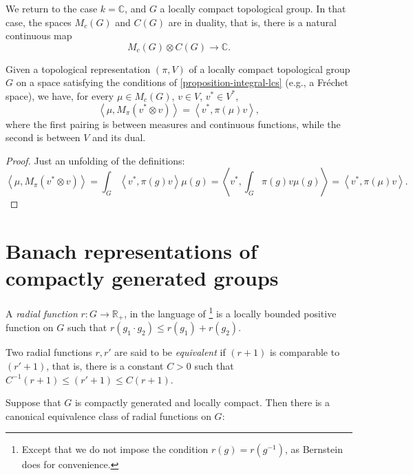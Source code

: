 We return to the case $k=\mathbb C$, and $G$ a locally compact topological group. In that case, the spaces $M_c(G)$ and $C(G)$ are in duality, that is, there is a natural continuous map
$$ M_c(G) \otimes C(G) \to \mathbb C.$$

\begin{lemma}
 \label{lemma-mc-dualto-operator}
Given a topological representation $(\pi, V)$ of  a locally compact topological group $G$ on a space satisfying the conditions of \ref{proposition-integral-lcs} (e.g., a Fr\'echet space), we have, for every $\mu\in M_c(G)$, $v\in V$, $v^*\in V^*$,
\begin{equation}
 \label{equation-mc-dualto-operator}
\left < \mu , M_\pi (v^*\otimes v)\right> = \left < v^*, \pi(\mu) v \right>,
\end{equation}
where the first pairing is between measures and continuous functions, while the second is between $V$ and its dual.
\end{lemma}

\begin{proof}
 Just an unfolding of the definitions:
$$\left < \mu , M_\pi (v^*\otimes v)\right> =  \int_G \left < v^*, \pi(g) v\right>  \mu(g) = \left < v^*, \int_G \pi(g) v \mu(g) \right> = \left < v^* , \pi(\mu) v\right>.$$
\end{proof}







 
 
\section{Banach representations of compactly generated groups}
\label{section-Banach-representations}

\begin{definition}
\label{definition-radial-function}
 A {\it radial function} $r: G\to \mathbb R_+$, in the language of 
 \cite{Bernstein-Plancherel}\footnote{Except that we do not impose the condition $r(g)=r(g^{-1})$, as Bernstein does for convenience.}
is a locally bounded positive function on $G$ such that $r(g_1\cdot g_2) \le r(g_1) + r(g_2)$. 

Two radial functions $r, r'$ are said to be {\it equivalent} if $(r+1)$ is comparable to $(r'+1)$, that is, there is a constant $C>0$ such that $C^{-1} (r+1)\le (r'+1) \le C (r+1)$.
\end{definition}

Suppose that $G$ is compactly generated and locally compact. Then there is a canonical equivalence class of radial functions on $G$:

